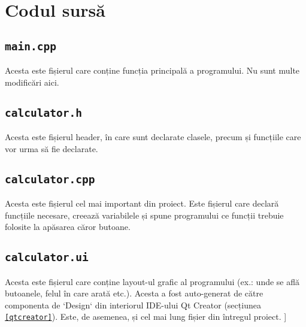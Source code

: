 \section{Codul sursă}
\subsection{\texttt{main.cpp}}
Acesta este fișierul care conține funcția principală a programului. Nu sunt multe modificări aici.


\subsection{\texttt{calculator.h}}
Acesta este fișierul header, în care sunt declarate clasele, precum și funcțiile care vor urma să fie declarate.


\subsection{\texttt{calculator.cpp}}
Acesta este fișierul cel mai important din proiect. Este fișierul care declară funcțiile necesare, creează variabilele și spune programului ce funcții trebuie folosite la apăsarea căror butoane.


\subsection{\texttt{calculator.ui}}
Acesta este fișierul care conține layout-ul grafic al programului (ex.: unde se află butoanele, felul în care arată etc.). Acesta a fost auto-generat de către componenta de `Design` din interiorul IDE-ului Qt Creator (secțiunea \texttt{\ref{qtcreator}}). Este, de asemenea, și cel mai lung fișier din întregul proiect.
]
